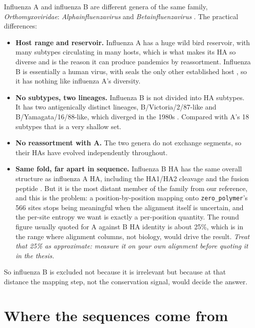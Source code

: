 \documentclass[11pt,a4paper]{article}
\newcommand{\file}[1]{\texttt{#1}}
\begin{document}
Influenza A and influenza B are different genera of the same family,
\emph{Orthomyxoviridae}: \emph{Alphainfluenzavirus} and
\emph{Betainfluenzavirus} \cite{ictv2024}. The practical differences:

\begin{itemize}
  \item \textbf{Host range and reservoir.} Influenza A has a huge wild bird
    reservoir, with many subtypes circulating in many hosts, which is what makes
    its HA so diverse and is the reason it can produce pandemics by reassortment.
    Influenza B is essentially a human virus, with seals the only other
    established host \cite{osterhaus2000}, so it has nothing like influenza A's
    diversity.
  \item \textbf{No subtypes, two lineages.} Influenza B is not divided into HA
    subtypes. It has two antigenically distinct lineages, B/Victoria/2/87-like
    and B/Yamagata/16/88-like, which diverged in the 1980s \cite{rota1990}.
    Compared with A's 18 subtypes that is a very shallow set.
  \item \textbf{No reassortment with A.} The two genera do not exchange
    segments, so their HAs have evolved independently throughout.
  \item \textbf{Same fold, far apart in sequence.} Influenza B HA has the same
    overall structure as influenza A HA, including the HA1/HA2 cleavage and the
    fusion peptide \cite{wang2008}. But it is the most distant member of the
    family from our reference, and this is the problem: a position-by-position
    mapping onto \file{zero\_polymer}'s 566 sites stops being meaningful when
    the alignment itself is uncertain, and the per-site entropy we want is
    exactly a per-position quantity. The round figure usually quoted for A
    against B HA identity is about 25\%, which is in the range where alignment
    columns, not biology, would drive the result. \emph{Treat that 25\% as
    approximate: measure it on your own alignment before quoting it in the
    thesis.}
\end{itemize}

\noindent
So influenza B is excluded not because it is irrelevant but because at that
distance the mapping step, not the conservation signal, would decide the answer.

\section{Where the sequences come from}
\end{document}
